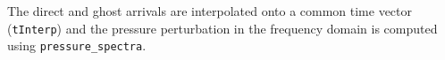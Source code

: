 \documentclass[10pt]{article}
\begin{document}
The direct and ghost arrivals are interpolated onto a common time vector (\texttt{tInterp}) and the pressure perturbation in the frequency domain is computed using \texttt{pressure\_spectra}.










\newpage


\end{document}

